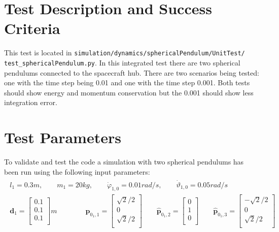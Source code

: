 \section{Test Description and Success Criteria}
This test is located in \texttt{simulation/dynamics/sphericalPendulum/UnitTest/\newline
test\_sphericalPendulum.py}. In this integrated test there are two spherical pendulums connected to the spacecraft hub.  There are two scenarios being tested: one with the time step being 0.01 and one with the time step 0.001. Both tests should show energy and momentum conservation but the 0.001 should show less integration error. 

\section{Test Parameters}

To validate and test the code a simulation with two spherical pendulums has been run using the following input parameters:
\begin{align}
\begin{split}
l_1=0.3 m, \qquad m_1=20 kg, \qquad \dot{\varphi}_{1,0}=0.01 rad/s, \qquad \dot{\vartheta}_{1,0}= 0.05 rad/s \\
\bm{d}_1=
\begin{bmatrix}
0.1 \\
0.1 \\
0.1\\
\end{bmatrix} m
\qquad
\qquad
\bm{\hat{p}}_{0_1,1}=
\begin{bmatrix}
\sqrt{2}/2 \\
0 \\
\sqrt{2}/2\\
\end{bmatrix}
\qquad
\bm{\hat{p}}_{0_1,2}=
\begin{bmatrix}
0 \\
1 \\
0\\
\end{bmatrix}
\qquad
\bm{\hat{p}}_{0_1,3}=
\begin{bmatrix}
-\sqrt{2}/2 \\
0 \\
\sqrt{2}/2\\
\end{bmatrix}
\end{split}
\end{align}

